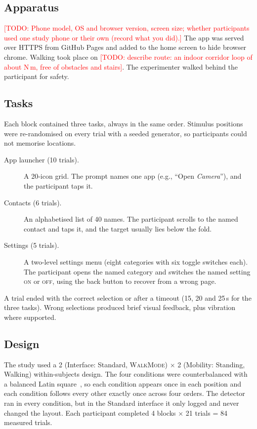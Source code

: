 \documentclass[sigconf,nonacm]{acmart}
\newcommand{\todo}[1]{\textcolor{red}{[TODO: #1]}}
\newcommand{\WM}{\textsc{WalkMode}}
\begin{document}
\subsection{Apparatus}
\todo{Phone model, OS and browser version, screen size; whether participants used one study phone or their own (record what you did).} The app was served over HTTPS from GitHub Pages and added to the home screen to hide browser chrome. Walking took place on \todo{describe route: an indoor corridor loop of about N\,m, free of obstacles and stairs}. The experimenter walked behind the participant for safety.

\subsection{Tasks}
Each block contained three tasks, always in the same order. Stimulus positions were re-randomised on every trial with a seeded generator, so participants could not memorise locations.
\begin{description}
  \item[App launcher (10 trials).] A 20-icon grid. The prompt names one app (e.g., ``Open \emph{Camera}''), and the participant taps it.
  \item[Contacts (6 trials).] An alphabetised list of 40 names. The participant scrolls to the named contact and taps it, and the target usually lies below the fold.
  \item[Settings (5 trials).] A two-level settings menu (eight categories with six toggle switches each). The participant opens the named category and switches the named setting \textsc{on} or \textsc{off}, using the back button to recover from a wrong page.
\end{description}
A trial ended with the correct selection or after a timeout (15, 20 and 25\,s for the three tasks). Wrong selections produced brief visual feedback, plus vibration where supported.

\subsection{Design}
The study used a 2 (Interface: Standard, \WM{}) $\times$ 2 (Mobility: Standing, Walking) within-subjects design. The four conditions were counterbalanced with a balanced Latin square~\cite{williams1949latin}, so each condition appears once in each position and each condition follows every other exactly once across four orders. The detector ran in every condition, but in the Standard interface it only logged and never changed the layout. Each participant completed 4 blocks $\times$ 21 trials = 84 measured trials.
\end{document}
